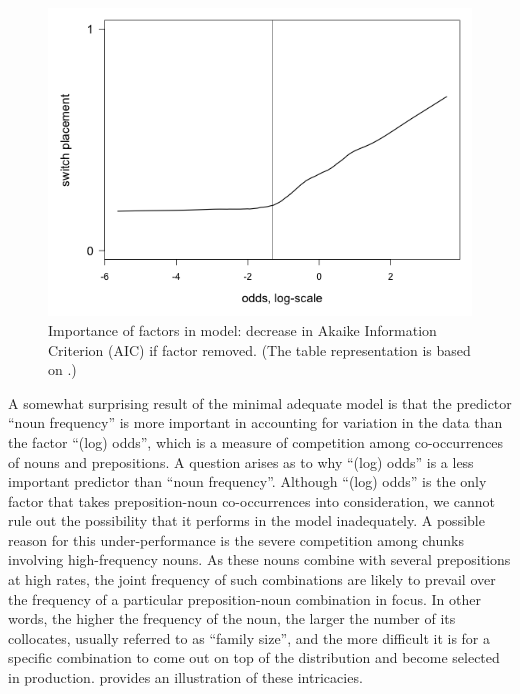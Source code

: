 \begin{figure}
	\includegraphics[scale=0.5]{figures/5-Figure_2.png}	
	\caption{Importance of factors in model: decrease in Akaike Information Criterion (AIC) if factor removed. (The table representation is based on \citealt{szmrecsanyi-2013}.)}\label{fig:5:5}
\end{figure}

A somewhat surprising result of the minimal adequate model is that the predictor “noun frequency” is more important in accounting for variation in the data than the factor “(log) odds”, which is a measure of competition among co-occurrences of nouns and prepositions. A question arises as to why “(log) odds” is a less important predictor than “noun frequency”. Although “(log) odds” is the only factor that takes preposition-noun co-occurrences into consideration, we cannot rule out the possibility that it  performs in the model inadequately. A possible reason for this under-performance is the severe competition among chunks involving high-frequency nouns. As these nouns combine with several prepositions at high rates, the joint frequency of such combinations are likely to prevail over the frequency of a particular preposition-noun combination in focus. In other words, the higher the frequency of the noun, the larger the number of its collocates, usually referred to as “family size”, and the more difficult it is for a specific combination to come out on top of the distribution and become selected in production.  provides an illustration of these intricacies. 

